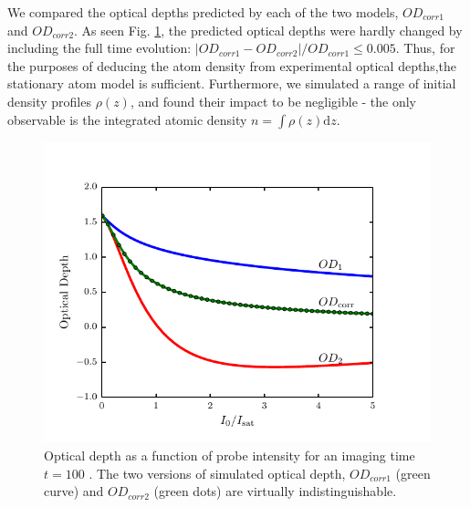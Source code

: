 \documentclass[12pt]{iopart}
\begin{document}
\par We compared the optical depths predicted by each of the two models, $OD_{corr1}$ and $OD_{corr2}$. As seen Fig. \ref{fig:atomTravel}, the predicted optical depths were hardly changed by including the full time evolution:  $\left|OD_{corr1}-OD_{corr2}\right|/OD_{corr1} \le 0.005$. Thus, for the purposes of deducing the atom density from experimental optical depths,the stationary atom model is sufficient. Furthermore, we simulated a range of initial density profiles $\rho(z)$, and found their impact to be negligible - the only observable is the integrated atomic density $n=\int\rho(z)\mathrm{d}z$. 
\begin{figure}
	\includegraphics{figure7.pdf}
\caption{Optical depth as a function of probe intensity for an imaging time $t=100$ \us. The two versions of simulated optical depth, $OD_{corr1}$ (green curve) and $OD_{corr2}$ (green dots) are virtually indistinguishable. }  
\label{fig:atomTravel}
\end{figure}
\end{document}
